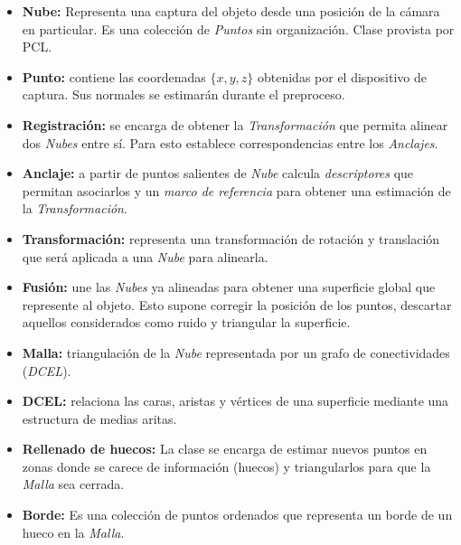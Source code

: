 \begin{itemize}
	\item {\bfseries Nube:}
		Representa una captura del objeto desde una posición de la cámara en particular.
		Es una colección de \emph{Puntos} sin organización. Clase provista por PCL.
	\item {\bfseries Punto:} contiene las coordenadas $\{x, y, z\}$ obtenidas por el
		dispositivo de captura. Sus normales se estimarán durante el preproceso.

	\item {\bfseries Registración:} se encarga de obtener la \emph{Transformación} que
		permita alinear dos \emph{Nubes} entre sí.  Para esto establece
		correspondencias entre los \emph{Anclajes}.
	\item {\bfseries Anclaje:} a partir de puntos salientes de \emph{Nube} calcula
		\emph{descriptores}  que permitan asociarlos y un
		\emph{marco de referencia} para obtener una estimación de la
		\emph{Transformación}.
	\item {\bfseries Transformación:} representa una transformación de rotación y translación
		que será aplicada a una \emph{Nube} para alinearla.

	\item {\bfseries Fusión:} une las \emph{Nubes} ya alineadas para
		obtener una superficie global que represente al objeto.
		Esto supone corregir la posición de los puntos, descartar
		aquellos considerados como ruido y triangular la superficie.
	\item {\bfseries Malla:} triangulación de la \emph{Nube}
		representada por un grafo de conectividades (\emph{DCEL}).
	\item {\bfseries DCEL:} relaciona las caras, aristas y vértices de una superficie mediante
		una estructura de medias aritas.

	\item {\bfseries Rellenado de huecos:} La clase se encarga de estimar
		nuevos puntos en zonas donde se carece de información (huecos)
		y triangularlos para que la \emph{Malla} sea cerrada.
	\item {\bfseries Borde:} Es una colección de puntos ordenados
		que representa un borde de un hueco en la \emph{Malla}.
\end{itemize}
